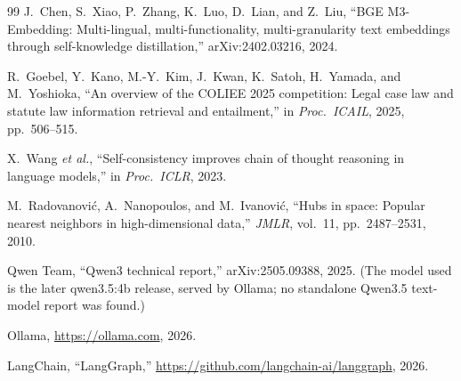 \documentclass[conference]{IEEEtran}
\begin{document}
\begin{thebibliography}{99}
 J.~Chen, S.~Xiao, P.~Zhang, K.~Luo, D.~Lian, and Z.~Liu, ``BGE M3-Embedding: Multi-lingual, multi-functionality, multi-granularity text embeddings through self-knowledge distillation,'' arXiv:2402.03216, 2024.

 R.~Goebel, Y.~Kano, M.-Y.~Kim, J.~Kwan, K.~Satoh, H.~Yamada, and M.~Yoshioka, ``An overview of the COLIEE 2025 competition: Legal case law and statute law information retrieval and entailment,'' in \emph{Proc.\ ICAIL}, 2025, pp.~506--515. %

 X.~Wang \emph{et al.}, ``Self-consistency improves chain of thought reasoning in language models,'' in \emph{Proc.\ ICLR}, 2023.

 M.~Radovanovi{\'c}, A.~Nanopoulos, and M.~Ivanovi{\'c}, ``Hubs in space: Popular nearest neighbors in high-dimensional data,'' \emph{JMLR}, vol.~11, pp.~2487--2531, 2010.

 Qwen Team, ``Qwen3 technical report,'' arXiv:2505.09388, 2025. (The model used is the later qwen3.5:4b release, served by Ollama; no standalone Qwen3.5 text-model report was found.)

 Ollama, \url{https://ollama.com}, 2026.

 LangChain, ``LangGraph,'' \url{https://github.com/langchain-ai/langgraph}, 2026.

\end{thebibliography}
\end{document}
